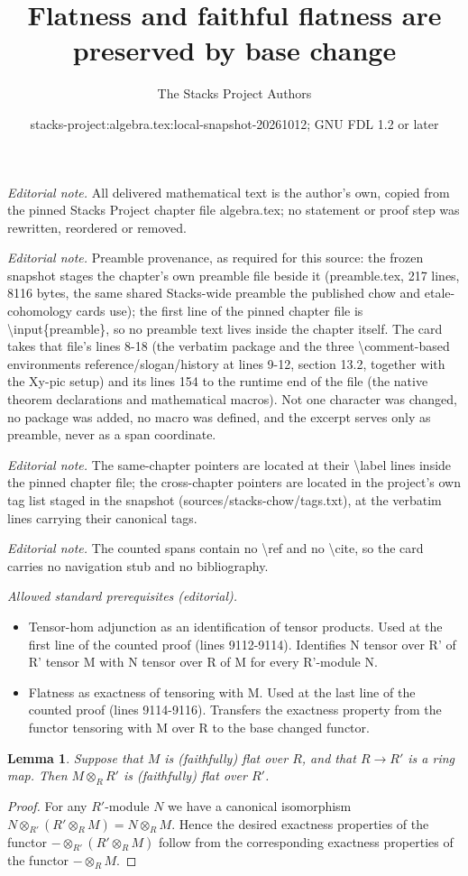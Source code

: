 \documentclass[10pt,a4paper]{amsart}
\title{Flatness and faithful flatness are preserved by base change}
\author{The Stacks Project Authors}
\date{stacks-project:algebra.tex:local-snapshot-20261012; GNU FDL 1.2 or later}
\theoremstyle{plain}
\newtheorem{lemma}[subsection]{Lemma}
\theoremstyle{definition}
\theoremstyle{remark}
\numberwithin{equation}{subsection}
\begin{document}
\maketitle
\noindent\textit{Editorial note.} All delivered mathematical text is the author's own, copied from the pinned Stacks Project chapter file algebra.tex; no statement or proof step was rewritten, reordered or removed.\par\medskip
\noindent\textit{Editorial note.} Preamble provenance, as required for this source: the frozen snapshot stages the chapter's own preamble file beside it (preamble.tex, 217 lines, 8116 bytes, the same shared Stacks-wide preamble the published chow and etale-cohomology cards use); the first line of the pinned chapter file is \textbackslash{}input\{preamble\}, so no preamble text lives inside the chapter itself. The card takes that file's lines 8-18 (the verbatim package and the three \textbackslash{}comment-based environments reference/slogan/history at lines 9-12, section 13.2, together with the Xy-pic setup) and its lines 154 to the runtime end of the file (the native theorem declarations and mathematical macros). Not one character was changed, no package was added, no macro was defined, and the excerpt serves only as preamble, never as a span coordinate.\par\medskip
\noindent\textit{Editorial note.} The same-chapter pointers are located at their \textbackslash{}label lines inside the pinned chapter file; the cross-chapter pointers are located in the project's own tag list staged in the snapshot (sources/stacks-chow/tags.txt), at the verbatim lines carrying their canonical tags.\par\medskip
\noindent\textit{Editorial note.} The counted spans contain no \textbackslash{}ref and no \textbackslash{}cite, so the card carries no navigation stub and no bibliography.\par\medskip
\noindent\textit{Allowed standard prerequisites (editorial).}\begin{itemize}
\item Tensor-hom adjunction as an identification of tensor products. Used at the first line of the counted proof (lines 9112-9114). Identifies N tensor over R' of R' tensor M with N tensor over R of M for every R'-module N.
\item Flatness as exactness of tensoring with M. Used at the last line of the counted proof (lines 9114-9116). Transfers the exactness property from the functor tensoring with M over R to the base changed functor.
\end{itemize}\medskip
\begin{lemma}
\label{lemma-flat-base-change}
Suppose that $M$ is (faithfully) flat over $R$, and that $R \to R'$
is a ring map. Then $M \otimes_R R'$ is (faithfully) flat over $R'$.
\end{lemma}

\begin{proof}
For any $R'$-module $N$ we have a canonical
isomorphism $N \otimes_{R'} (R'\otimes_R M)
= N \otimes_R M$. Hence the desired exactness properties of the functor
$-\otimes_{R'}(R'\otimes_R M)$ follow from
the corresponding exactness properties of the functor $-\otimes_R M$.
\end{proof}
\end{document}
